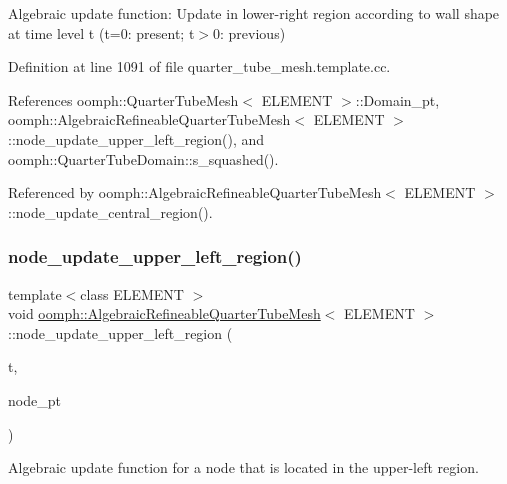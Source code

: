 Algebraic update function\+: Update in lower-\/right region according to wall shape at time level t (t=0\+: present; t$>$0\+: previous) 

Definition at line 1091 of file quarter\+\_\+tube\+\_\+mesh.\+template.\+cc.



References oomph\+::\+Quarter\+Tube\+Mesh$<$ E\+L\+E\+M\+E\+N\+T $>$\+::\+Domain\+\_\+pt, oomph\+::\+Algebraic\+Refineable\+Quarter\+Tube\+Mesh$<$ E\+L\+E\+M\+E\+N\+T $>$\+::node\+\_\+update\+\_\+upper\+\_\+left\+\_\+region(), and oomph\+::\+Quarter\+Tube\+Domain\+::s\+\_\+squashed().



Referenced by oomph\+::\+Algebraic\+Refineable\+Quarter\+Tube\+Mesh$<$ E\+L\+E\+M\+E\+N\+T $>$\+::node\+\_\+update\+\_\+central\+\_\+region().

\mbox{\label{classoomph_1_1AlgebraicRefineableQuarterTubeMesh_ac82a39ccaed8016a9b1e841d91658a75}} 
\subsubsection{\texorpdfstring{node\+\_\+update\+\_\+upper\+\_\+left\+\_\+region()}{node\_update\_upper\_left\_region()}}
{\footnotesize\ttfamily template$<$class E\+L\+E\+M\+E\+NT $>$ \\
void \hyperlink{classoomph_1_1AlgebraicRefineableQuarterTubeMesh}{oomph\+::\+Algebraic\+Refineable\+Quarter\+Tube\+Mesh}$<$ E\+L\+E\+M\+E\+NT $>$\+::node\+\_\+update\+\_\+upper\+\_\+left\+\_\+region (\begin{DoxyParamCaption}\item[{const unsigned \&}]{t,  }\item[{Algebraic\+Node $\ast$\&}]{node\+\_\+pt }\end{DoxyParamCaption})\hspace{0.3cm}{\ttfamily [private]}}



Algebraic update function for a node that is located in the upper-\/left region. 

